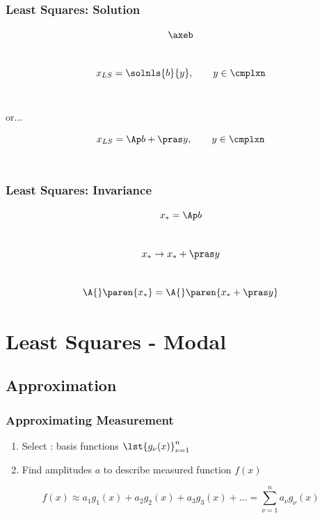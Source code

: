 \documentclass[handout]{beamer}
\begin{document}
\begin{frame}      %
\frametitle{Least Squares: Solution}
  $$\axeb$$ \\[10pt]
  \pause
  $$x_{LS} = \solnls{b}{y}, \qquad y\in\cmplxn$$ \\[10pt]
  \begin{center}
     or...
  \end{center}
  $$x_{LS} = \Ap b + \pras y, \qquad y\in\cmplxn$$ \\[10pt]
\end{frame}

\begin{frame}      %
\frametitle{Least Squares: Invariance}
  $$x_{*} = \Ap b$$ \\[10pt]
  $$x_{*} \rightarrow x_{*} + \pras y$$ \\[10pt]
  $$\A{}\paren{x_{*}} = \A{}\paren{x_{*} + \pras y}$$
  \twodots
\end{frame}

\section{Least Squares - Modal}

\subsection{Approximation}

\begin{frame}      %
\frametitle{Approximating Measurement}
  \begin{enumerate}
    \item Select : basis functions $\lst{g_{\nu}(x)}_{\nu=1}^{n}$ \\[15pt]
    \item Find amplitudes $a$ to describe measured function $f(x)$ \\[15pt]
  \end{enumerate}
  $$f ( x ) \approx a_{1} g_{1}(x) + a_{2} g_{2}(x) + a_{3} g_{3}(x) + \dots = \sum\limits_{\nu=1}^{n} a_{\nu} g_{\nu}(x)$$ 
\end{frame}
\end{document}
